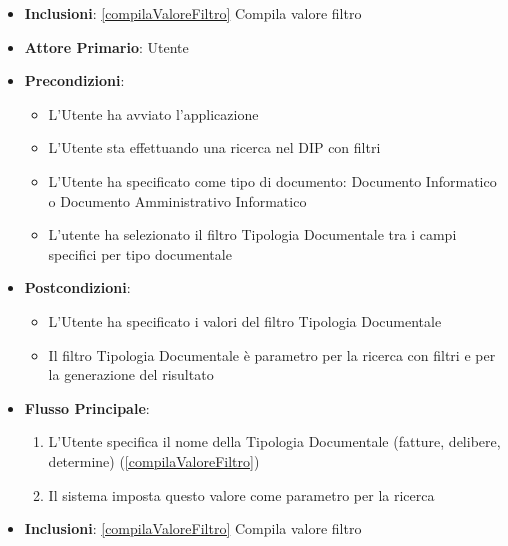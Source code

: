 \begin{itemize}
\begin{enumerate}
            protocollato tali parametri fanno riferimento alla protocollazione) (\ref{compilaValoreFiltro})
            \item L'Utente specifica il Numero Documento (di Registrazione del Documento o di Protocollo) (\ref{compilaValoreFiltro})
            \item L'Utente specifica il Codice Registro (\ref{compilaValoreFiltro})
            \item Il sistema imposta i valori del filtro come parametri per la ricerca
      \end{enumerate}
      \item \textbf{Inclusioni}: \ref{compilaValoreFiltro} Compila valore filtro
\end{itemize}

\begin{itemize}
      \item \textbf{Attore Primario}: Utente
      \item \textbf{Precondizioni}: 
      \begin{itemize}
            \item L'Utente ha avviato l'applicazione
            \item L'Utente sta effettuando una ricerca nel DIP con filtri
            \item L'Utente ha specificato come tipo di documento: Documento Informatico o Documento Amministrativo Informatico
            \item L'utente ha selezionato il filtro Tipologia Documentale tra i campi specifici per tipo documentale
      \end{itemize}
      \item \textbf{Postcondizioni}: 
      \begin{itemize}
            \item L'Utente ha specificato i valori del filtro Tipologia Documentale
            \item Il filtro Tipologia Documentale è parametro per la ricerca con filtri e per la generazione del risultato
      \end{itemize}
      \item \textbf{Flusso Principale}:
      \begin{enumerate}
            \item L'Utente specifica il nome della Tipologia Documentale (fatture, delibere,
            determine) (\ref{compilaValoreFiltro})
            \item Il sistema imposta questo valore come parametro per la ricerca
      \end{enumerate}
      \item \textbf{Inclusioni}: \ref{compilaValoreFiltro} Compila valore filtro
\end{itemize}


